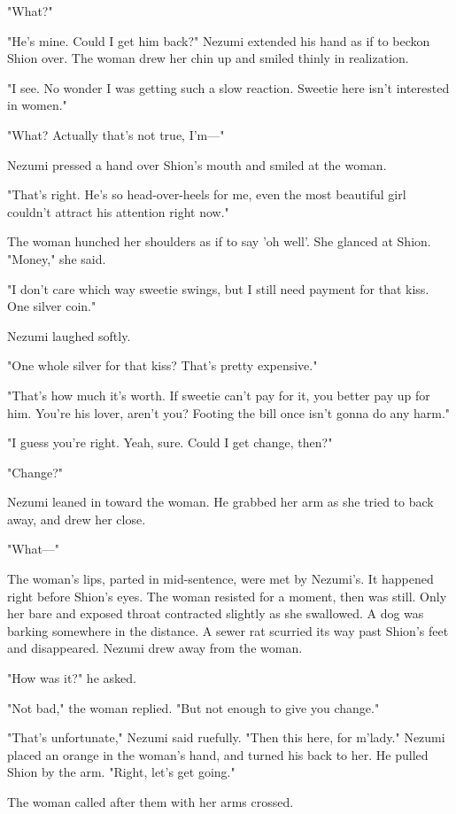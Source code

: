 "What?"

"He's mine. Could I get him back?" Nezumi extended his hand as if to
beckon Shion over. The woman drew her chin up and smiled thinly in
realization.

"I see. No wonder I was getting such a slow reaction. Sweetie here isn't
interested in women."

"What? Actually that's not true, I'm---"

Nezumi pressed a hand over Shion's mouth and smiled at the woman.

"That's right. He's so head-over-heels for me, even the most beautiful
girl couldn't attract his attention right now."

The woman hunched her shoulders as if to say 'oh well'. She glanced at
Shion. "Money," she said.

"I don't care which way sweetie swings, but I still need payment for
that kiss. One silver coin."

Nezumi laughed softly.

"One whole silver for that kiss? That's pretty expensive."

"That's how much it's worth. If sweetie can't pay for it, you better pay
up for him. You're his lover, aren't you? Footing the bill once isn't
gonna do any harm."

"I guess you're right. Yeah, sure. Could I get change, then?"

"Change?"

Nezumi leaned in toward the woman. He grabbed her arm as she tried to
back away, and drew her close.

"What---"

The woman's lips, parted in mid-sentence, were met by Nezumi's. It
happened right before Shion's eyes. The woman resisted for a moment,
then was still. Only her bare and exposed throat contracted slightly as
she swallowed. A dog was barking somewhere in the distance. A sewer rat
scurried its way past Shion's feet and disappeared. Nezumi drew away
from the woman.

"How was it?" he asked.

"Not bad," the woman replied. "But not enough to give you change."

"That's unfortunate," Nezumi said ruefully. "Then this here, for
m'lady." Nezumi placed an orange in the woman's hand, and turned his
back to her. He pulled Shion by the arm. "Right, let's get going."

The woman called after them with her arms crossed.

